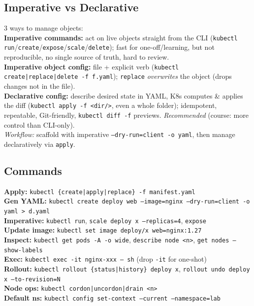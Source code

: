 \subsection{Imperative vs Declarative}
3 ways to manage objects: \\
\textbf{Imperative commands:} act on live objects straight from the CLI (\texttt{kubectl run}/\texttt{create}/\texttt{expose}/\texttt{scale}/\texttt{delete}); fast for one-off/learning, but not reproducible, no single source of truth, hard to review. \\
\textbf{Imperative object config:} file + explicit verb (\texttt{kubectl create|replace|delete -f f.yaml}); \texttt{replace} \textit{overwrites} the object (drops changes not in the file). \\
\textbf{Declarative config:} describe desired state in YAML, K8s computes \& applies the diff (\texttt{kubectl apply -f <dir/>}, even a whole folder); idempotent, repeatable, Git-friendly, \texttt{kubectl diff -f} previews. \textit{Recommended} (course: more control than CLI-only). \\
\textit{Workflow:} scaffold with imperative \texttt{--dry-run=client -o yaml}, then manage declaratively via \texttt{apply}.

\subsection{Commands}
\textbf{Apply:} \texttt{kubectl \{create|apply|replace\} -f manifest.yaml} \\
\textbf{Gen YAML:} \texttt{kubectl create deploy web --image=nginx --dry-run=client -o yaml > d.yaml} \\
\textbf{Imperative:} \texttt{kubectl run}, \texttt{scale deploy x --replicas=4}, \texttt{expose} \\
\textbf{Update image:} \texttt{kubectl set image deploy/x web=nginx:1.27} \\
\textbf{Inspect:} \texttt{kubectl get pods -A -o wide}, \texttt{describe node <n>}, \texttt{get nodes --show-labels} \\
\textbf{Exec:} \texttt{kubectl exec -it nginx-xxx -- sh} (drop \texttt{-it} for one-shot) \\
\textbf{Rollout:} \texttt{kubectl rollout \{status|history\} deploy x}, \texttt{rollout undo deploy x --to-revision=N} \\
\textbf{Node ops:} \texttt{kubectl cordon|uncordon|drain <n>} \\
\textbf{Default ns:} \texttt{kubectl config set-context --current --namespace=lab}
